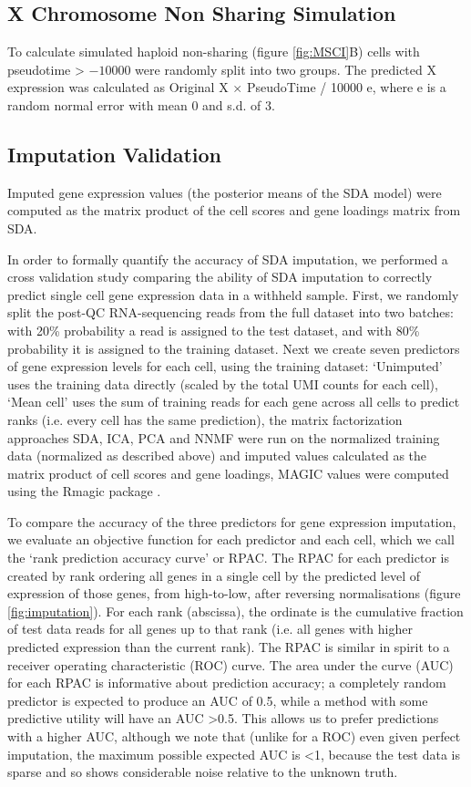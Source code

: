 \subsection{X Chromosome Non Sharing Simulation}
\label{sec:msci_methods}
To calculate simulated haploid non-sharing (figure \ref{fig:MSCI}B) cells with pseudotime > $-10000$ were randomly split into two groups.
The predicted X expression was calculated as Original X $\times$ PseudoTime / 10000  e, where e is a random normal error with mean 0 and s.d. of 3.

\subsection{Imputation Validation}
\label{sec:imputation_methods}
Imputed gene expression values (the posterior means of the SDA model) were computed as the matrix product of the cell scores and gene loadings matrix from SDA.

In order to formally quantify the accuracy of SDA imputation, we performed a cross validation study comparing the ability of SDA imputation to correctly predict single cell gene expression data in a withheld sample.
First, we randomly split the post-QC RNA-sequencing reads from the full dataset into two batches: with 20\% probability a read is assigned to the test dataset, and with 80\% probability it is assigned to the training dataset.
Next we create seven predictors of gene expression levels for each cell, using the training dataset: ‘Unimputed’ uses the training data directly (scaled by the total UMI counts for each cell), ‘Mean cell’ uses the sum of training reads for each gene across all cells to predict ranks (i.e. every cell has the same prediction), the matrix factorization approaches SDA, ICA, PCA and NNMF were run on the normalized training data (normalized as described above) and imputed values calculated as the matrix product of cell scores and gene loadings, MAGIC values were computed using the Rmagic package \parencite{vanDijk2018Recovering}.

To compare the accuracy of the three predictors for gene expression imputation, we evaluate an objective function for each predictor and each cell, which we call the ‘rank prediction accuracy curve’ or RPAC.
The RPAC for each predictor is created by rank ordering all genes in a single cell by the predicted level of expression of those genes, from high-to-low, after reversing normalisations (figure \ref{fig:imputation}).
For each rank (abscissa), the ordinate is the cumulative fraction of test data reads for all genes up to that rank (i.e. all genes with higher predicted expression than the current rank).
The RPAC is similar in spirit to a receiver operating characteristic (ROC) curve.
The area under the curve (AUC) for each RPAC is informative about prediction accuracy; a completely random predictor is expected to produce an AUC of 0.5, while a method with some predictive utility will have an AUC >0.5.
This allows us to prefer predictions with a higher AUC, although we note that (unlike for a ROC) even given perfect imputation, the maximum possible expected AUC is <1, because the test data is sparse and so shows considerable noise relative to the unknown truth.


